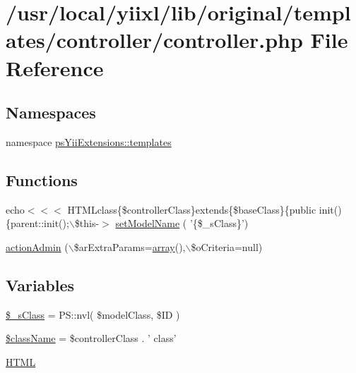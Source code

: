 \hypertarget{controller_2controller_8php}{
\section{/usr/local/yiixl/lib/original/templates/controller/controller.php File Reference}
\label{controller_2controller_8php}
}
\subsection*{Namespaces}
\begin{DoxyCompactItemize}
\item 
namespace \hyperlink{namespacepsYiiExtensions_1_1templates}{psYiiExtensions::templates}
\end{DoxyCompactItemize}
\subsection*{Functions}
\begin{DoxyCompactItemize}
\item 
echo$<$$<$$<$ HTMLclass\{\$controllerClass\}extends\{\$baseClass\}\{public init()\{parent::init();$\backslash$\$this-\/$>$ \hyperlink{controller_2controller_8php_ae6ce858af9c0a042cb66462891bea7ba}{setModelName} ( '\{\$\_\-sClass\}')
\item 
\hyperlink{controller_2controller_8php_ac07535441a96d81597bbb6a32aa02c87}{actionAdmin} ($\backslash$\$arExtraParams=\hyperlink{list_8php_aa3205d038c7f8feb5c9f01ac4dfadc88}{array}(),$\backslash$\$oCriteria=null)
\end{DoxyCompactItemize}
\subsection*{Variables}
\begin{DoxyCompactItemize}
\item 
\hyperlink{controller_2controller_8php_a7d53885feef470ba528847a3f2f1f93a}{\$\_\-sClass} = PS::nvl( \$modelClass, \$ID )
\item 
\hyperlink{controller_2controller_8php_acd6a475a6eeb092f4eea3e19e502d67d}{\$className} = \$controllerClass . ' class'
\item 
\hyperlink{controller_2controller_8php_a2c8135527015cd4586959ac7c2ffec92}{HTML}
\end{DoxyCompactItemize}


